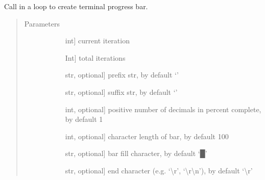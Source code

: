 \documentclass[letterpaper,10pt,english]{sphinxmanual}
\begin{document}

\begin{fulllineitems}
\label{\detokenize{index:gps2net.printProgressBar}}
Call in a loop to create terminal progress bar.
\begin{quote}\begin{description}
\item[{Parameters}] \leavevmode\begin{description}
\item[{}] \leavevmode{[}int{]}
current iteration

\item[{}] \leavevmode{[}Int{]}
total iterations

\item[{}] \leavevmode{[}str, optional{]}
prefix str, by default ‘’

\item[{}] \leavevmode{[}str, optional{]}
suffix str, by default ‘’

\item[{}] \leavevmode{[}int, optional{]}
positive number of decimals in percent complete, by default 1

\item[{}] \leavevmode{[}int, optional{]}
character length of bar, by default 100

\item[{}] \leavevmode{[}str, optional{]}
bar fill character, by default ‘█’

\item[{}] \leavevmode{[}str, optional{]}
end character (e.g. ‘\textbackslash{}r’, ‘\textbackslash{}r\textbackslash{}n’), by default ‘\textbackslash{}r’

\end{description}

\end{description}\end{quote}

\end{fulllineitems}



\renewcommand{\indexname}{Python Module Index}
\begin{sphinxtheindex}
\let\bigletter\sphinxstyleindexlettergroup
\bigletter{g}
\item\relax{}
\end{sphinxtheindex}

\renewcommand{\indexname}{Index}
\printindex
\end{document}
